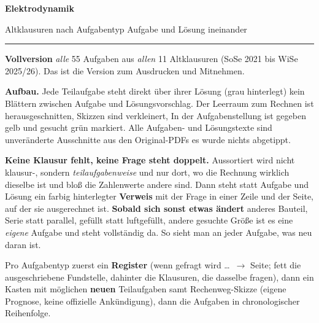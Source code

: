 \documentclass[a4paper,10pt]{article}
\begin{document}
\thispagestyle{empty}
\vspace*{14mm}
{\sffamily\bfseries\Huge Elektrodynamik}\par\vspace{3mm}
{\sffamily\LARGE\color{Grau} Altklausuren nach Aufgabentyp \textendash{} Aufgabe und Lösung ineinander}\par\vspace{4mm}
{\color{black}\rule{\textwidth}{1.2pt}}\par\vspace{7mm}
{\large\textbf{Vollversion} \textendash{} \emph{alle} 55 Aufgaben
aus \emph{allen} 11 Altklausuren (SoSe 2021 bis WiSe 2025/26). Das ist die
Version zum Ausdrucken und Mitnehmen.}\par\vspace{6mm}

\textbf{Aufbau.} Jede Teilaufgabe steht direkt über ihrer Lösung (grau
hinterlegt) \textendash{} kein Blättern zwischen Aufgabe und Lösungsvorschlag.
Der Leerraum zum Rechnen ist herausgeschnitten, Skizzen sind verkleinert,
In der Aufgabenstellung ist \colorbox{Marker!45}{gegeben} gelb und
\colorbox{MarkerG!45}{gesucht} grün markiert.
Alle Aufgaben- und Lösungstexte sind unveränderte Ausschnitte aus den
Original-PDFs \textendash{} es wurde nichts abgetippt.\par\vspace{3mm}

\textbf{Keine Klausur fehlt, keine Frage steht doppelt.} Aussortiert wird
nicht klausur-, sondern \emph{teilaufgabenweise} \textendash{} und nur dort,
wo die Rechnung wirklich dieselbe ist und bloß die Zahlenwerte andere sind.
Dann steht statt Aufgabe und Lösung ein farbig hinterlegter \textbf{Verweis}
mit der Frage in einer Zeile und der Seite, auf der sie ausgerechnet ist.
\textbf{Sobald sich sonst etwas ändert} \textendash{} anderes Bauteil,
Serie statt parallel, gefüllt statt luftgefüllt, andere gesuchte Größe
\textendash{} ist es eine \emph{eigene} Aufgabe und steht vollständig da.
So sieht man an jeder Aufgabe, was neu daran ist.
\par\vspace{3mm}

Pro Aufgabentyp zuerst ein \textbf{Register} (\glqq wenn gefragt wird \ldots\
$\rightarrow$ Seite\grqq{}; fett die ausgeschriebene Fundstelle, dahinter die
Klausuren, die dasselbe fragen), dann ein Kasten mit möglichen \textbf{neuen}
Teilaufgaben samt Rechenweg-Skizze (eigene Prognose, keine offizielle
Ankündigung), dann die Aufgaben in chronologischer Reihenfolge.
\par\vspace{7mm}
\end{document}
